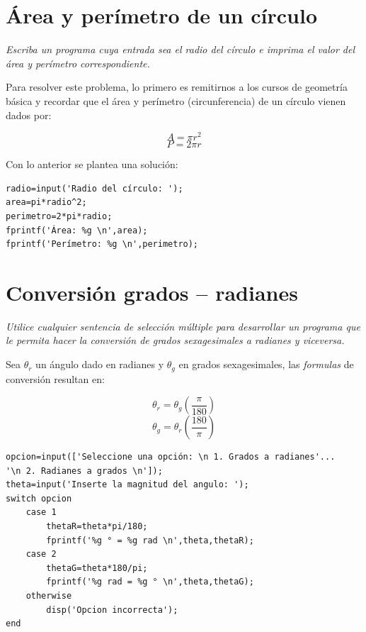
\section{Área y perímetro de un círculo}

\textit{Escriba un programa cuya entrada sea el radio del círculo e imprima el valor del área y 
perímetro correspondiente.}

\sol

Para resolver este problema, lo primero es remitirnos a los cursos de geometría básica y recordar 
que el área y perímetro (circunferencia) de un círculo vienen dados por:

$$A=\pi r^2$$
$$P=2 \pi r$$

Con lo anterior se plantea una solución:

\begin{verbatim}
radio=input('Radio del círculo: ');
area=pi*radio^2;
perimetro=2*pi*radio;
fprintf('Área: %g \n',area);
fprintf('Perímetro: %g \n',perimetro);
\end{verbatim}


\section{Conversión grados – radianes}

\textit{Utilice cualquier sentencia de selección múltiple para desarrollar un programa que le permita hacer la conversión de grados sexagesimales a radianes y viceversa.}

\sol

Sea $\theta_r$ un ángulo dado en radianes y $\theta_g$ en grados sexagesimales, las {\it formulas} de 
conversión resultan en:

$$\theta_r = \theta_g \left(\frac{\pi}{180}\right)$$
$$\theta_g = \theta_r \left(\frac{180}{\pi}\right)$$

\begin{verbatim}
opcion=input(['Seleccione una opción: \n 1. Grados a radianes'...
'\n 2. Radianes a grados \n']);
theta=input('Inserte la magnitud del angulo: ');
switch opcion
    case 1
        thetaR=theta*pi/180;
        fprintf('%g ° = %g rad \n',theta,thetaR);
    case 2
        thetaG=theta*180/pi;
        fprintf('%g rad = %g ° \n',theta,thetaG);
    otherwise
        disp('Opcion incorrecta');
end
\end{verbatim}


